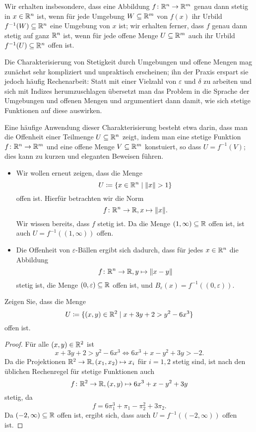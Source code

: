 \documentclass[a4paper,10pt]{article}
\begin{document}
\begin{bem}
 Wir erhalten insbesondere, dass eine Abbildung $f \colon \mathbb{R}^n \to \mathbb{R}^m$ genau dann stetig in $x \in \mathbb{R}^n$ ist, wenn für jede Umgebung $W \subseteq \mathbb{R}^m$ von $f(x)$ ihr Urbild $f^{-1}(W) \subseteq \mathbb{R}^n$ eine Umgebung von $x$ ist; wir erhalten ferner, dass $f$ genau dann stetig auf ganz $\mathbb{R}^n$ ist, wenn für jede offene Menge $U \subseteq \mathbb{R}^m$ auch ihr Urbild $f^{-1}(U) \subseteq \mathbb{R}^n$ offen ist.
\end{bem}


Die Charakterisierung von Stetigkeit durch Umgebungen und offene Mengen mag zunächst sehr kompliziert und unpraktisch erscheinen; ihn der Praxis erspart sie jedoch häufig Rechenarbeit: Statt mit einer Vielzahl von $\varepsilon$ und $\delta$ zu arbeiten und sich mit Indizes herumzuschlagen übersetzt man das Problem in die Sprache der Umgebungen und offenen Mengen und argumentiert dann damit, wie sich stetige Funktionen auf diese auswirken.


Eine häufige Anwendung dieser Charakterisierung besteht etwa darin, dass man die Offenheit einer Teilmenge $U \subseteq \mathbb{R}^n$ zeigt, indem man eine stetige Funktion $f \colon \mathbb{R}^n \to \mathbb{R}^m$ und eine offene Menge $V \subseteq \mathbb{R}^m$ konstuiert, so dass $U = f^{-1}(V)$; dies kann zu kurzen und eleganten Beweisen führen.


\begin{bsp}
 \begin{itemize}
  \item
   Wir wollen erneut zeigen, dass die Menge
   \[
    U \coloneqq \{x \in \mathbb{R}^n \mid \|x\| > 1\}
   \]
   offen ist. Hierfür betrachten wir die Norm
   \[
    f \colon \mathbb{R}^n \to \mathbb{R}, x \mapsto \|x\|.
   \]
   Wir wissen bereits, dass $f$ stetig ist. Da die Menge $(1,\infty) \subseteq \mathbb{R}$ offen ist, ist auch $U = f^{-1}((1,\infty))$ offen.
  \item
   Die Offenheit von $\varepsilon$-Bällen ergibt sich dadurch, dass für jedes $x \in \mathbb{R}^n$ die Abbildung
   \[
    f \colon \mathbb{R}^n \to \mathbb{R}, y \mapsto \|x-y\|
   \]
   stetig ist, die Menge $(0,\varepsilon) \subseteq \mathbb{R}$ offen ist, und $B_\varepsilon(x) = f^{-1}((0,\varepsilon))$.
 \end{itemize}
\end{bsp}


\begin{question}
 Zeigen Sie, dass die Menge
 \[
  U \coloneqq \{(x,y) \in \mathbb{R}^2 \mid x + 3y + 2 > y^2 - 6x^3 \}
 \]
 offen ist.
\end{question}
\begin{proof}
 Für alle $(x,y) \in \mathbb{R}^2$ ist
 \[
  x + 3y + 2 > y^2 - 6x^3
  \Leftrightarrow 6x^3 + x - y^2 + 3y > -2.
 \]
 Da die Projektionen $\mathbb{R}^2 \to \mathbb{R}, (x_1, x_2) \mapsto x_i$ für $i=1,2$ stetig sind, ist nach den üblichen Rechenregel für stetige Funktionen auch
 \[
  f \colon \mathbb{R}^2 \to \mathbb{R}, (x,y) \mapsto 6x^3 + x - y^2 + 3y
 \]
 stetig, da
 \[
  f = 6 \pi_1^3 + \pi_1 - \pi_2^2 + 3 \pi_2.
 \]
 Da $(-2,\infty) \subseteq \mathbb{R}$ offen ist, ergibt sich, dass auch $U = f^{-1}((-2,\infty))$ offen ist.
\end{proof}
\end{document}
